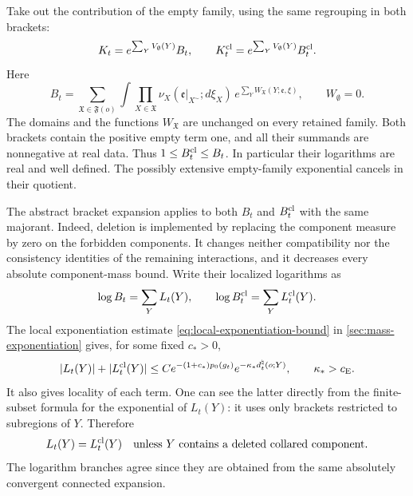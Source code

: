 \documentclass[11pt,letterpaper,reqno]{amsart}
\theoremstyle{definition}
\theoremstyle{remark}
\begin{document}
Take out the contribution of the empty family, using the same
regrouping in both brackets:
\[
 K_t=e^{\sum_Y V_\emptyset(Y)}B_t,\qquad
 K_t^{\rm cl}=e^{\sum_Y V_\emptyset(Y)}B_t^{\rm cl}.
\]
Here
\[
 B_t=\sum_{\mathfrak X\in\mathfrak F(o)}
     \int\prod_{X\in\mathfrak X}
       \nu_X(\mathfrak e|_{X^\sim};d\xi_X)\,
                 e^{\sum_Y W_{\mathfrak X}(Y;\mathfrak e,\xi)},
 \qquad W_\emptyset=0.
\]
The domains and the functions \(W_{\mathfrak X}\) are unchanged on
every retained family. Both brackets contain the positive empty term
one, and all their summands are nonnegative at real data. Thus
\(1\le B_t^{\rm cl}\le B_t\). In particular their logarithms are real
and well defined. The possibly extensive empty-family exponential
cancels in their quotient.

The abstract bracket expansion applies to both \(B_t\) and
\(B_t^{\rm cl}\) with the same majorant. Indeed, deletion is implemented
by replacing the component measure by zero on the forbidden
components. It changes neither compatibility nor the consistency
identities of the remaining interactions, and it decreases every
absolute component-mass bound. Write their localized logarithms as
\[
 \log B_t=\sum_Y L_t(Y),\qquad
 \log B_t^{\rm cl}=\sum_Y L_t^{\rm cl}(Y).
\]
The local exponentiation estimate
\eqref{eq:local-exponentiation-bound} in
\cref{sec:mass-exponentiation} gives, for some fixed \(c_*>0\),
\begin{equation}\label{eq:clean-bracket-local-log-bound}
 |L_t(Y)|+|L_t^{\rm cl}(Y)|
 \le C e^{-(1+c_*)p_0(g_t)}
                  e^{-\kappa_*d^\natural_t(o;Y)},
 \qquad \kappa_*>c_{\rm E}.
\end{equation}
It also gives locality of each term. One can see the latter directly
from the finite-subset formula for the exponential of \(L_t(Y)\):
it uses only brackets restricted to subregions of \(Y\).
Therefore
\[
 L_t(Y)=L_t^{\rm cl}(Y)
 \quad\hbox{unless \(Y\) contains a deleted collared component.}
\]
The logarithm branches agree since they are obtained from the same
absolutely convergent connected expansion.
\end{document}
